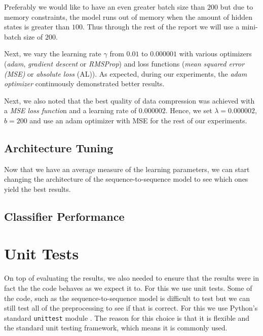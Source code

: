 Preferably we would like to have an even greater batch size than $200$ but due to memory constraints, the model runs out of memory when the amount of hidden states is greater than $100$.
Thus through the rest of the report we will use a mini-batch size of $200$.

Next, we vary the learning rate $\gamma$ from $0.01$ to $0.000001$ with various optimizers (\textit{adam}, \textit{gradient descent} or \textit{RMSProp}) and loss functions (\textit{mean squared error (MSE)} or \textit{absolute loss} (AL)).
As expected, during our experiments, the \textit{adam optimizer} continuously demonstrated better results.

Next, we also noted that the best quality of data compression was achieved with a \textit{MSE loss functio}n and a learning rate of $0.000002$.
Hence, we set $\lambda = 0.000002$, $b = 200$ and use an adam optimizer with MSE for the rest of our experiments.



\subsection{Architecture Tuning}

Now that we have an average measure of the learning parameters, we can start changing the architecture of the sequence-to-sequence model to see which ones yield the best results.


\subsection{Classifier Performance}



\section{Unit Tests}

On top of evaluating the results, we also needed to ensure that the results were in fact the the code behaves as we expect it to.
For this we use unit tests.
Some of the code, such as the sequence-to-sequence model is difficult to test but we can still test all of the preprocessing to see if that is correct.
For this we use Python's standard \texttt{unittest} module \cite{python_unittest_documentation}.
The reason for this choice is that it is flexible and the standard unit testing framework, which means it is commonly used.

